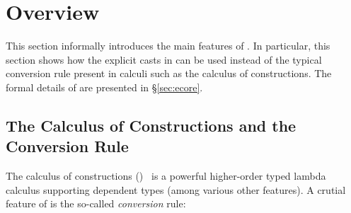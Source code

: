 \newcommand{\framedhslinecorrect}[2]%
  {#1[#2]}

\newcommand{\framedhs}{\sethscode{framedhscode}}


\newenvironment{inlinehscode}%
  {\(\def\column##1##2{}%
   \let\>\undefined\let\<\undefined\let\\\undefined
   \newcommand\>[1][]{}\newcommand\<[1][]{}\newcommand\\[1][]{}%
   \def\fromto##1##2##3{##3}%
   \def\nextline{}}{\) }%

\newcommand{\inlinehs}{\sethscode{inlinehscode}}


\newenvironment{joincode}%
  {\let\orighscode=\hscode
   \let\origendhscode=\endhscode
   \def\endhscode{\def\hscode{\endgroup\def\@currenvir{hscode}\\}\begingroup}
   \orighscode\def\hscode{\endgroup\def\@currenvir{hscode}}}%
  {\origendhscode
   \global\let\hscode=\orighscode
   \global\let\endhscode=\origendhscode}%

\makeatother
\EndFmtInput
%

\section{Overview}

This section informally introduces the main features of \name. In
particular, this section shows how the explicit casts in \name can be
used instead of the typical conversion rule present in calculi such as
the calculus of constructions. The formal details of \name are
presented in \S\ref{sec:ecore}. 

\subsection{The Calculus of Constructions and the Conversion Rule}
\label{sec:coc}

The calculus of constructions (\coc)~\cite{coc} is a powerful
higher-order typed lambda calculus supporting dependent types (among
various other features).  A crutial
feature of \coc is the so-called \emph{conversion}
rule: \ottusedrule{\ottdruleTccXXConv{}}

